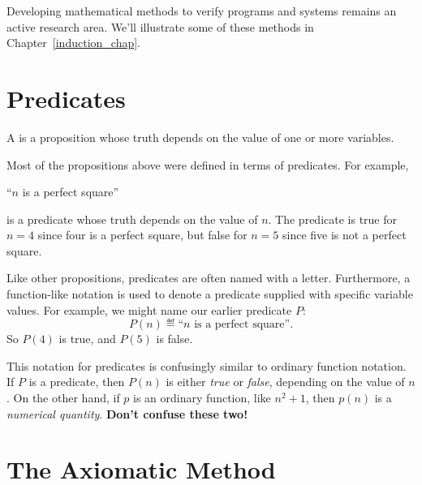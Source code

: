 Developing mathematical methods to verify programs and systems remains
an active research area.  We'll illustrate some of these methods in
Chapter~\ref{induction_chap}.

\begin{problems}
\classproblems
{}
\end{problems}


\section{Predicates}

A  is a proposition whose truth depends on the value of
one or more variables.  
\iffalse
From Mairson: Sept '11

A predicate is an expression that, when you replace all variables in
the expression with values, is a proposition.  So "n is a perfect
square" is a predicate because, upon replacing n with a number 4
(among an infinite number of such choices), you get the proposition "4
is a perfect square".  Remember, nothing says that the proposition has
to be true---replacing n with 5 would give "5 is a perfect square",
which is false.
\fi

Most of the propositions above were defined in terms of predicates.
For example,
%
\begin{center}
``$n$ is a perfect square''
\end{center}
%
is a predicate whose truth depends on the value of $n$.  The predicate is
true for $n = 4$ since four is a perfect square, but false for $n = 5$
since five is not a perfect square.  

Like other propositions, predicates are often named with a letter.
Furthermore, a function-like notation is used to denote a predicate
supplied with specific variable values.  For example, we might name
our earlier predicate $P$:
%
\[
P(n) \eqdef \text{``$n$ is a perfect square''}.
\]
%
So $P(4)$ is true, and $P(5)$ is false.

This notation for predicates is confusingly similar to ordinary function
notation.  If $P$ is a predicate, then $P(n)$ is either \textit{true} or
\textit{false}, depending on the value of $n$.  On the other hand, if $p$
is an ordinary function, like $n^2 + 1$, then $p(n)$ is a
\textit{numerical quantity}.  \textbf{Don't confuse these two!}

\section{The Axiomatic Method}

